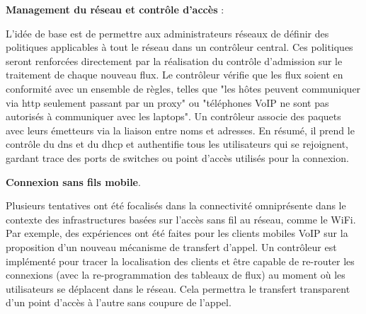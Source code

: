 \textbf{Management du réseau et contrôle d'accès} : 

L'idée de base est de permettre aux administrateurs réseaux de définir des politiques applicables à tout le réseau dans un contrôleur central. Ces politiques seront renforcées directement par la réalisation du contrôle d'admission sur le traitement de chaque nouveau flux. Le contrôleur vérifie que les flux soient en conformité avec un ensemble de règles, telles que "les hôtes peuvent communiquer via \gls{http} seulement passant par un proxy" ou "téléphones VoIP ne sont pas autorisés à communiquer avec les laptops". Un contrôleur associe des paquets avec leurs émetteurs via la liaison entre noms et adresses. En résumé, il prend le contrôle du \gls{dns} et du \gls{dhcp} et authentifie tous les utilisateurs qui se rejoignent, gardant trace des ports de switches ou point d'accès utilisés pour la connexion.



\textbf{Connexion sans fils mobile}.

Plusieurs tentatives ont été focalisés dans la connectivité omniprésente dans le contexte des infrastructures basées sur l'accès sans fil au réseau, comme le WiFi. Par exemple, des expériences ont été faites pour les clients mobiles VoIP sur la proposition d'un nouveau mécanisme de transfert d'appel. Un contrôleur est implémenté pour tracer la localisation des clients et être capable de re-router les connexions (avec la re-programmation des tableaux de flux) au moment où les utilisateurs se déplacent dans le réseau. Cela permettra le transfert transparent d'un point d'accès à l'autre sans coupure de l'appel. \cite{OpenFlowStanfordUsing}


